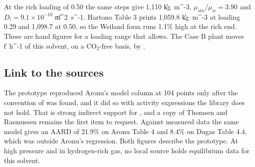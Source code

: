 At the rich loading of 0.50 the same steps give 1,110 \U{kg\ m^{-3}}, $\mu_{sln}/\mu_w=3.90$ and $D_l=9.1\times10^{-10}$ \U{m^2\ s^{-1}}. Hartono Table 3 prints 1,059.8 \U{kg\ m^{-3}} at loading 0.29 and 1,098.7 at 0.50, so the Weiland form runs 1.1\% high at the rich end. These are hand figures for a loading range that  allows. The Case B plant moves \vMsolvB{} \U{t\ h^{-1}} of this solvent, on a CO$_2$-free basis, by .

\subsection*{Link to the sources}
The prototype reproduced Aronu's model column at 104 points only after the convention of  was found, and it did so with activity expressions the library does not hold. That is strong indirect support for , and a copy of Thomsen and Rasmussen remains the first item to request. Against measured data the same model gives an AARD of 21.9\% on Aronu Table 4 and 8.4\% on Dugas Table 4.4, which was outside Aronu's regression. Both figures describe the prototype. At high pressure and in hydrogen-rich gas, no local source holds equilibrium data for this solvent.
